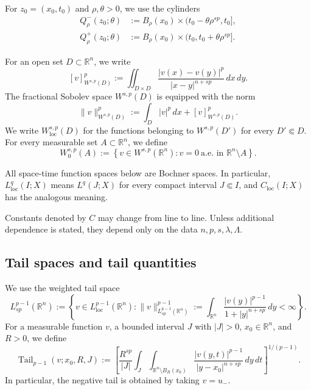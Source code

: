 \documentclass[10pt]{amsart}
\theoremstyle{plain}
\theoremstyle{definition}
\theoremstyle{remark}
\numberwithin{equation}{section}
\newcommand{\R}{\mathbb R}
\begin{document}
For $z_0=(x_0,t_0)$ and $\rho,\theta>0$, we use the cylinders
\[
\begin{split}
Q^-_\rho(z_0;\theta)&:=B_\rho(x_0)\times(t_0-\theta\rho^{sp},t_0],\\
Q^+_\rho(z_0;\theta)&:=B_\rho(x_0)\times(t_0,t_0+\theta\rho^{sp}].
\end{split}
\]

For an open set $D\subset\R^n$, we write
\[
[v]_{W^{s,p}(D)}^p
:=\iint_{D\times D}
\frac{|v(x)-v(y)|^p}{|x-y|^{n+sp}}\,dx\,dy.
\]
The fractional Sobolev space $W^{s,p}(D)$ is equipped with the norm
\begin{equation}\label{eq:Wsp-norm}
\|v\|_{W^{s,p}(D)}^p
:=
\int_D|v|^p\,dx
+[v]_{W^{s,p}(D)}^p.
\end{equation}
We write $W^{s,p}_{\mathrm{loc}}(D)$ for the functions belonging to
$W^{s,p}(D')$ for every $D'\Subset D$. For every measurable set
$A\subset\R^n$, we define
\[
    W^{s,p}_0(A)
    :=
    \left\{
    v\in W^{s,p}(\R^n):
    v=0\ \text{a.e. in }\R^n\setminus A
    \right\}.
\]

All space-time function spaces below are Bochner spaces. In particular,
$L^q_{\mathrm{loc}}(I;X)$ means $L^q(J;X)$ for every compact interval
$J\Subset I$, and $C_{\mathrm{loc}}(I;X)$ has the analogous meaning.

Constants denoted by $C$ may change from line to line. Unless additional
dependence is stated, they depend only on the data
$n,p,s,\lambda,\Lambda$.

\subsection{Tail spaces and tail quantities}

We use the weighted tail space
\begin{equation}\label{eq:tail-space}
L^{p-1}_{sp}(\R^n)
:=
\left\{
v\in L^{p-1}_{\mathrm{loc}}(\R^n):
\|v\|_{L^{p-1}_{sp}(\R^n)}^{p-1}
:=
\int_{\R^n}
\frac{|v(y)|^{p-1}}{1+|y|^{n+sp}}\,dy
<\infty
\right\}.
\end{equation}
For a measurable function $v$, a bounded interval $J$ with $|J|>0$,
$x_0\in\R^n$, and $R>0$, we define
\begin{equation}\label{eq:tail-def}
\operatorname{Tail}_{p-1}(v;x_0,R,J)
:=
\left[
\frac{R^{sp}}{|J|}
\int_J\int_{\R^n\setminus B_R(x_0)}
\frac{|v(y,t)|^{p-1}}{|y-x_0|^{n+sp}}\,dy\,dt
\right]^{1/(p-1)}.
\end{equation}
In particular, the negative tail is obtained by taking $v=u_-$.
\end{document}

